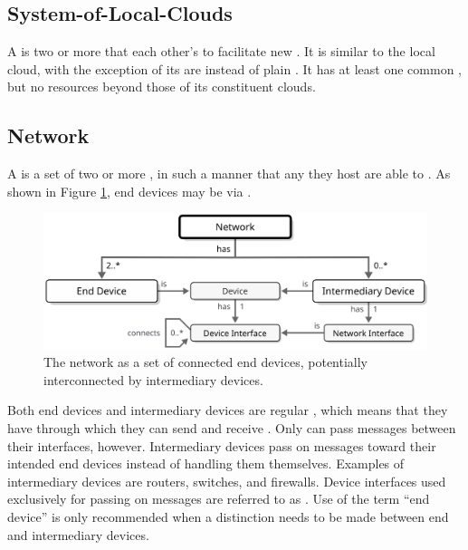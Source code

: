 \subsection{System-of-Local-Clouds}
\label{sec:concepts:solc}

A  is two or more  that  each other's  to facilitate new .
It is similar to the local cloud, with the exception of its  are  instead of plain .
It has at least one common , but no resources beyond those of its constituent clouds.

\subsection{Network}
\label{sec:concepts:network}

A  is a set of two or more ,  in such a manner that any  they host are able to .
As shown in Figure \ref{fig:network}, end devices may be  via .

\begin{figure}[ht!]
  \centering
  \includegraphics[scale=0.9]{figures/network}
  \caption{
    The network as a set of connected end devices, potentially interconnected by intermediary devices.
  }
  \label{fig:network}
\end{figure}

Both end devices and intermediary devices are regular , which means that they have  through which they can send and receive .
Only  can pass messages between their interfaces, however.
Intermediary devices pass on messages toward their intended end devices instead of handling them themselves.
Examples of intermediary devices are routers, switches, and firewalls.
Device interfaces used exclusively for passing on messages are referred to as .
Use of the term ``end device'' is only recommended when a distinction needs to be made between end and intermediary devices.

